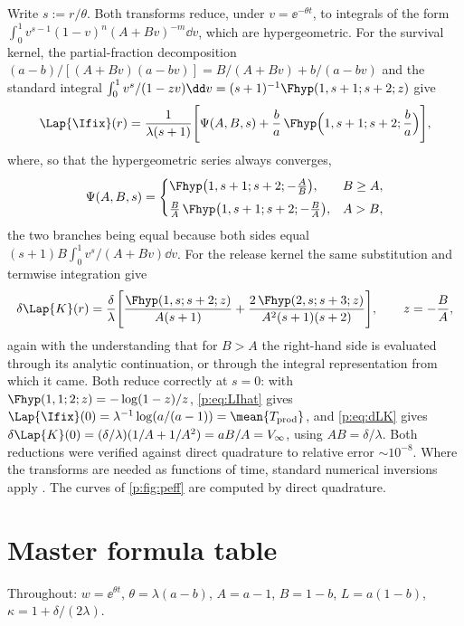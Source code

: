 Write $s:=r/\theta$. Both transforms reduce, under $v=\ee^{-\theta t}$, to
integrals of the form $\int_0^1 v^{s-1}(1-v)^n(A+Bv)^{-m}\dd v$, which are
hypergeometric. For the survival kernel, the partial-fraction decomposition
$(a-b)/[(A+Bv)(a-bv)]=B/(A+Bv)+b/(a-bv)$ and the standard integral
$\int_0^1 v^s/(1-zv)\dd v=(s+1)^{-1}\Fhyp(1,s+1;s+2;z)$ give
\begin{equation}
\Lap{\Ifix}(r)=\frac{1}{\lambda(s+1)}
\Biggl[
\Psi(A,B,s)
+\frac{b}{a}\,\Fhyp\Bigl(1,s+1;s+2;\frac{b}{a}\Bigr)
\Biggr],
\label{p:eq:LIhat}
\end{equation}
where, so that the hypergeometric series always converges,
\begin{equation}
\Psi(A,B,s)=
\begin{cases}
\Fhyp\bigl(1,s+1;s+2;-\frac{A}{B}\bigr), & B\ge A,\\[0.4em]
\frac{B}{A}\,\Fhyp\bigl(1,s+1;s+2;-\frac{B}{A}\bigr), & A>B,
\end{cases}
\label{p:eq:Psi}
\end{equation}
the two branches being equal because both sides equal
$(s+1)B\int_0^1 v^s/(A+Bv)\dd v$. For the release kernel the same
substitution and termwise integration give
\begin{equation}
\delta\Lap{K}(r)=\frac{\delta}{\lambda}
\Biggl[
\frac{\Fhyp(1,s;s+2;z)}{A(s+1)}
+\frac{2\,\Fhyp(2,s;s+3;z)}{A^2(s+1)(s+2)}
\Biggr],
\qquad z=-\frac{B}{A},
\label{p:eq:dLK}
\end{equation}
again with the understanding that for $B>A$ the right-hand side is evaluated
through its analytic continuation, or through the integral representation
from which it came. Both reduce correctly at $s=0$: with
$\Fhyp(1,1;2;z)=-\log(1-z)/z$, \cref{p:eq:LIhat} gives
$\Lap{\Ifix}(0)=\lambda^{-1}\log(a/(a-1))=\mean{T_{\rm prod}}$, and
\cref{p:eq:dLK} gives $\delta\Lap{K}(0)=(\delta/\lambda)(1/A+1/A^2)=aB/A
=V_\infty$, using $AB=\delta/\lambda$. Both reductions were verified against
direct quadrature to relative error $\sim10^{-8}$. Where the transforms are
needed as functions of time, standard numerical inversions apply
\cite{stehfest1970algorithm,gaver1965observations}. The curves of
\cref{p:fig:peff} are computed by direct quadrature.

\section{Master formula table}
\label{p:app:formulae}

Throughout: $w=\ee^{\theta t}$, $\theta=\lambda(a-b)$, $A=a-1$, $B=1-b$,
$L=a(1-b)$, $\kappa=1+\delta/(2\lambda)$.

